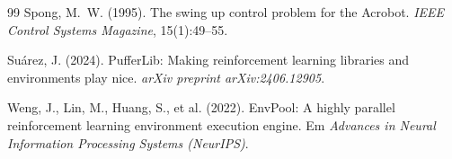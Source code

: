 \documentclass[12pt]{article}
\begin{document}
\begin{thebibliography}{99}
Spong, M.~W. (1995).
The swing up control problem for the Acrobot.
\emph{IEEE Control Systems Magazine}, 15(1):49--55.

Suárez, J. (2024).
PufferLib: Making reinforcement learning libraries and environments play
nice.
\emph{arXiv preprint arXiv:2406.12905}.

Weng, J., Lin, M., Huang, S., et al. (2022).
EnvPool: A highly parallel reinforcement learning environment execution
engine.
Em \emph{Advances in Neural Information Processing Systems (NeurIPS)}.

\end{thebibliography}
\end{document}
